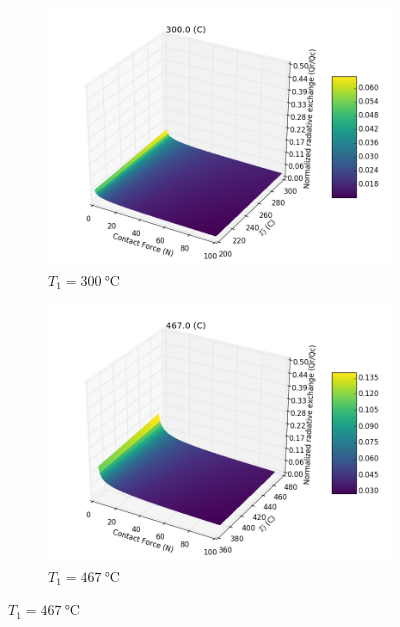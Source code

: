 \begin{figure}[!ht]
    \centering
    \begin{subfigure}[b]{0.45\textwidth}
        \centering
        \includegraphics[width=\textwidth]{figures/conduction-vs-radiation/300.0.png}
        \caption{$T_1 = \SI{300}{\celsius}$}
    \end{subfigure}
    \begin{subfigure}[b]{0.45\textwidth}
        \centering
        \includegraphics[width=\textwidth]{figures/conduction-vs-radiation/467.0.png}
        \caption{$T_1 = \SI{467}{\celsius}$}
    \end{subfigure}
    

\end{figure}
